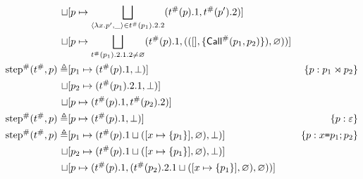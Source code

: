 \documentclass{article}
\begin{document}
\begin{align*}
  \sqcup                             & [p\mapsto\bigsqcup_{\langle\lambda x.p',\_\rangle\in{t}^{\#}(p_1).2.2}({t}^{\#}(p).1,{t}^{\#}(p').2)]                                                                                                                 \\
  \sqcup                             & [p\mapsto\bigsqcup_{{t}^{\#}(p_1).2.1.2\neq\varnothing}({t}^{\#}(p).1,(([],\{{\textsf{Call}}^{\#}(p_1,p_2)\}),\varnothing))]                                                                                                      \\
  {\text{step}}^{\#}({t}^{\#},p) \triangleq & [p_1\mapsto({t}^{\#}(p).1,\bot)]                                                                                                       & \{{p}:{{p_1}\rtimes{p_2}}\}                                                      \\
  \sqcup                             & [p_2\mapsto({t}^{\#}(p_1).2.1,\bot)]                                                                                                                                                                                      \\
  \sqcup                             & [p\mapsto({t}^{\#}(p).1,{t}^{\#}(p_2).2)]                                                                                                                                                                               \\
  {\text{step}}^{\#}({t}^{\#},p) \triangleq & [p\mapsto({t}^{\#}(p).1,\bot)]                                                                                                         & \{{p}:{\varepsilon}\}                                                          \\
  {\text{step}}^{\#}({t}^{\#},p) \triangleq & [p_1\mapsto({t}^{\#}(p).1\sqcup([x\mapsto\{p_1\}],\varnothing),\bot)]                                                                  & \{{p}:{x\texttt{=}p_1;p_2}\}                                                   \\
  \sqcup                             & [p_2\mapsto({t}^{\#}(p).1\sqcup([x\mapsto\{p_1\}],\varnothing),\bot)]                                                                                                                                                     \\
  \sqcup                             & [p\mapsto({t}^{\#}(p).1,({t}^{\#}(p_2).2.1\sqcup([x\mapsto\{p_1\}],\varnothing),\varnothing))]
\end{align*}
\end{document}
